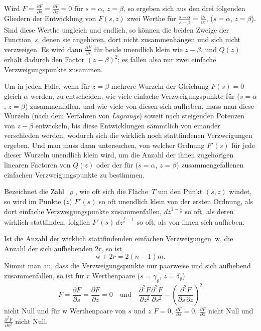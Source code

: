 \documentclass[a4paper,12pt,leqno]{article}
\begin{document}
Wird
$\displaystyle F
   = \frac{\partial F}{\partial s}
   = \frac{\partial F}{\partial z}
   = 0$
f\"{u}r $s = \alpha$, $z = \beta$, so ergeben sich aus den drei
folgenden Gliedern der Entwicklung von $F(s,z)$ zwei Werthe
f\"{u}r
$\displaystyle\frac{s - \alpha}{s- \beta} = \frac{\partial s}{\partial z}$,
($s = \alpha$, $z = \beta$).  Sind diese Werthe ungleich und
endlich, so k\"{o}nnen die beiden Zweige der Function~$s$, denen
sie angeh\"{o}ren, dort nicht zusammenh\"{a}ngen und sich nicht
verzweigen.  Es wird dann
$\displaystyle \frac{\partial F}{\partial s}$
f\"{u}r beide unendlich klein wie $z - \beta$, und $Q(z)$
erh\"{a}lt dadurch den Factor $(z - \beta)^2$; es fallen also nur
zwei einfache Verzweigungspunkte zusammen.

Um in jeden Falle, wenn f\"{u}r $z = \beta$ mehrere Wurzeln der
Gleichung $F(s) = 0$ gleich $\alpha$ werden, zu entscheiden, wie
viele einfache Verzweigungspunkte f\"{u}r ($s = \alpha$, $z =
\beta$) zusammenfallen, und wie viele von diesen sich aufheben,
muss man diese Wurzeln (nach dem Verfahren von \emph{Lagrange})
soweit nach steigenden Potenzen von $z - \beta$ entwickeln, bis
diese Entwicklungen s\"{a}mmtlich von einander verschieden werden,
wodurch sich die wirklich noch stattfindenen Verzweigungen
ergeben.  Und man muss dann untersuchen, von welcher Ordnung
$F'(s)$ f\"{u}r jede dieser Wurzeln unendlich klein wird, um die
Anzahl der ihnen zugeh\"{o}rigen linearen Factoren von $Q(z)$
oder der f\"{u}r ($s = \alpha$, $z = \beta$) zusammengefallenen
einfachen Verzweigungspunkte zu bestimmen.

Bezeichnet die Zahl~$\varrho$, wie oft sich die Fl\"{a}che~$T$
um den Punkt $(s,z)$ windet, so wird im Punkte ($z$) $F'(s)$ so
oft unendlich klein von der ersten Ordnung, als dort einfache
Verzweigungspunkte zusammenfallen,
$dz^{1 - \frac{1}{\varrho}}$ so oft, als deren wirklich
stattfinden, folglich $F'(s) \, dz^{\frac{1}{\varrho} - 1}$ so
oft, als von ihnen sich aufheben.

Ist die Anzahl der wirklich stattfindenden einfachen
Verzweigungen~$\mathrm{w}$, die Anzahl der sich aufhebenden $2r$,
so ist
\[ \mathrm{w} + 2r = 2 (n - 1) m.\]
Nimmt man an, dass die Verzweigungspunkte nur paarweise und sich
aufhebend zusammenfallen, so ist f\"{u}r $r$ Werthenpaare
\label{`Werthenpaare'}
($s= \gamma_\varrho$, $z = \delta_\varrho$)
\[ F = \frac{\partial F}{\partial s}
     = \frac{\partial F}{\partial z} = 0
      \quad\mbox{und}\quad
   \frac{\partial^2 F}{\partial z^2} \frac{\partial^2 F}{\partial s^2}
   - \left( \frac{\partial^2 F}{\partial s \, \partial z} \right)^2 \]
nicht Null und f\"{u}r $\mathrm{w}$ Werthenpaare von $s$ und $z$
$F = 0$,
$\displaystyle \frac{\partial F}{\partial s} = 0$,
$\displaystyle \frac{\partial F}{\partial z}$
nicht Null und
$\displaystyle \frac{\partial^2 F}{\partial s^2}$
nicht Null.
\end{document}

